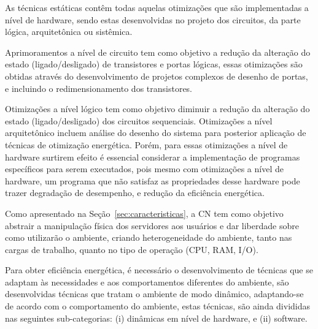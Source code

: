 \documentclass[tcc,capa]{texufpel}
\begin{document}
As técnicas estáticas contêm todas aquelas otimizações que são implementadas a nível de hardware, sendo estas desenvolvidas no projeto dos circuitos, da parte lógica, arquitetônica ou sistêmica. 

Aprimoramentos a nível de circuito tem como objetivo a redução da alteração do estado (ligado/desligado) de transistores e portas lógicas, essas otimizações são obtidas através do desenvolvimento de projetos complexos de desenho de portas, e incluindo o redimensionamento dos transistores. 

Otimizações a nível lógico tem como objetivo diminuir a redução da alteração do estado (ligado/desligado) dos circuitos sequenciais. Otimizações a nível arquitetônico incluem análise do desenho do sistema para posterior aplicação de técnicas de otimização energética. Porém, para essas otimizações a nível de hardware surtirem efeito é essencial considerar a implementação de programas específicos para serem executados, pois mesmo com otimizações a nível de hardware, um programa que não satisfaz as propriedades desse hardware pode trazer degradação de desempenho, e redução da eficiência energética.
 
Como apresentado na Seção~\ref{sec:caracteristicas}, a CN tem como objetivo abstrair a manipulação física dos servidores aos usuários e dar liberdade sobre como utilizarão o ambiente, criando heterogeneidade do ambiente, tanto nas cargas de trabalho, quanto no tipo de operação (CPU, RAM, I/O). 

Para obter eficiência energética, é necessário o desenvolvimento de técnicas que se adaptam às necessidades e aos comportamentos diferentes do ambiente, são desenvolvidas técnicas que tratam o ambiente de modo dinâmico, adaptando-se de acordo com o comportamento do ambiente, estas técnicas, são ainda divididas nas seguintes sub-categorias: (i) dinâmicas em nível de hardware, e (ii) software. 
\end{document}
